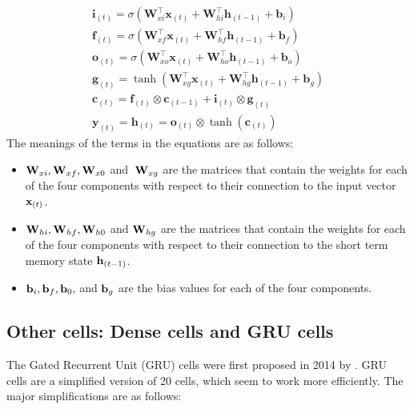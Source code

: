 \begin{equation} 
    \begin{array}{l}
    \mathbf{i}_{(t)}=\sigma\left(\mathbf{W}_{x i}^{\top} \mathbf{x}_{(t)}+\mathbf{W}_{h i}^{\top} \mathbf{h}_{(t-1)}+\mathbf{b}_{i}\right) \\
    \mathbf{f}_{(t)}=\sigma\left(\mathbf{W}_{x f}^{\top} \mathbf{x}_{(t)}+\mathbf{W}_{h f}^{\top} \mathbf{h}_{(t-1)}+\mathbf{b}_{f}\right) \\
    \mathbf{o}_{(t)}=\sigma\left(\mathbf{W}_{x o}^{\top} \mathbf{x}_{(t)}+\mathbf{W}_{h o}^{\top} \mathbf{h}_{(t-1)}+\mathbf{b}_{o}\right) \\
    \mathbf{g}_{(t)}=\tanh \left(\mathbf{W}_{x g}^{\top} \mathbf{x}_{(t)}+\mathbf{W}_{h g}^{\top} \mathbf{h}_{(t-1)}+\mathbf{b}_{g}\right) \\
    \mathbf{c}_{(t)}=\mathbf{f}_{(t)} \otimes \mathbf{c}_{(t-1)}+\mathbf{i}_{(t)} \otimes \mathbf{g}_{(t)} \\
    \mathbf{y}_{(t)}=\mathbf{h}_{(t)}=\mathbf{o}_{(t)} \otimes \tanh \left(\mathbf{c}_{(t)}\right)
    \end{array}
    \label{systemformula}
\end{equation}
The meanings of the terms in the equations are as follows:

\begin{itemize}
    \item  ${\bf W}_{xi} , {\bf W}_{xf} , {\bf W}_{x0}$ and $\: {\bf W}_{xg}$ are the matrices that contain the weights for each of the four components with respect to their connection to the input vector ${\bf x}_{(t)}$.
   
    \item ${\bf W}_{hi} , {\bf W}_{hf} , {\bf W}_{h0}$ and ${\bf W}_{hg}$ are the matrices that contain the weights for each of the four components with respect to their connection to the short term memory state ${\bf h}_{(t-1)}$.
    
    \item ${\bf b}_{i} , {\bf b}_{f}, {\bf b}_{0},$  and ${\bf b}_{g}$ are the bias values for each of the four components. 

\end{itemize}

\clearpage

\subsection{Other cells: Dense cells and GRU cells}
The Gated Recurrent Unit (GRU) cells were first proposed in 2014 by \citeauthor{DBLP:journals/corr/ChoMGBSB14} \autocite{DBLP:journals/corr/ChoMGBSB14}. GRU cells are a simplified version of 20 cells, which seem to work more efficiently. The major simplifications are as follows:

